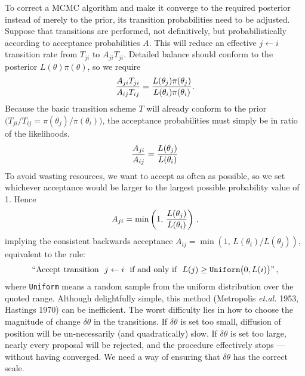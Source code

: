 To correct a MCMC algorithm and make it converge to the required posterior instead of merely to the prior, its transition probabilities need to be adjusted.
Suppose that transitions are performed, not definitively, but probabilistically according to acceptance probabilities $A$.
This will reduce an effective $j \leftarrow i$ transition rate from $T_{ji}$ to $A_{ji} T_{ji}$.
Detailed balance should conform to the posterior $L(\theta)\pi(\theta)$, so we require
$$
    {A_{ji} T_{ji} \over A_{ij} T_{ij}} =
    {L(\theta_j)\pi(\theta_j) \over L(\theta_i)\pi(\theta_i)}.
$$
Because the basic transition scheme $T$ will already conform to the prior $\big(T_{ji}/T_{ij} = \pi(\theta_j)/\pi(\theta_i)\big)$,
the acceptance probabilities must simply be in ratio of the likelihoods.
$$
    {A_{ji} \over A_{ij}} = {L(\theta_j) \over L(\theta_i)}
$$
To avoid wasting resources, we want to accept as often as possible, so we set whichever acceptance would be larger to the largest possible probability value of 1.
Hence
$$
    A_{ji} = \min \left( 1 ,\, {L(\theta_j) \over L(\theta_i)} \right)\,,
$$
implying the consistent backwards acceptance $A_{ij} = \min \left( 1 ,\, L(\theta_i) / L(\theta_j) \right)$, equivalent to the rule:
$$
  \hbox{``Accept transition $\ j \leftarrow i\ $ if and only if $\ L(j) \ge {\tt Uniform}\big(0, L(i)\big)$''}\,,
$$
where {\tt Uniform} means a random sample from the uniform distribution over the quoted range.
Although delightfully simple, this method (Metropolis {\it et.al.} 1953, Hastings 1970) can be inefficient.
The worst difficulty lies in how to choose the magnitude of change $\delta\theta$ in the transitions.
If $\delta\theta$ is set too small, diffusion of position will be un-necessarily (and quadratically) slow.
If $\delta\theta$ is set too large, nearly every proposal will be rejected, and the procedure effectively stops --- without having converged.
We need a way of ensuring that $\delta\theta$ has the correct scale.

